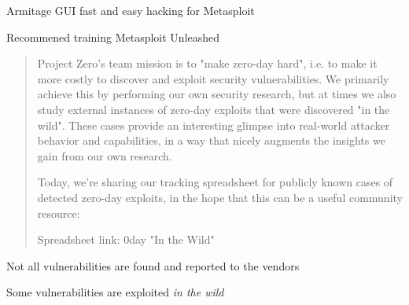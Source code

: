 \documentclass[Screen16to9,17pt]{foils}
\begin{document}
\begin{list1}
\item {}
\item Armitage GUI fast and easy hacking for Metasploit\\
\item Recommened training Metasploit Unleashed\\
\end{list1}




\begin{quote}

  Project Zero's team mission is to "make zero-day hard", i.e. to make it more costly to discover and exploit security vulnerabilities. We primarily achieve this by performing our own security research, but at times we also study external instances of zero-day exploits that were discovered "in the wild". These cases provide an interesting glimpse into real-world attacker behavior and capabilities, in a way that nicely augments the insights we gain from our own research.

  Today, we're sharing our tracking spreadsheet for publicly known cases of detected zero-day exploits, in the hope that this can be a useful community resource:

  Spreadsheet link: 0day "In the Wild"\\
\end{quote}

\begin{list2}
\item Not all vulnerabilities are found and reported to the vendors
\item Some vulnerabilities are exploited \emph{in the wild}
\end{list2}

\slidenext
\end{document}
